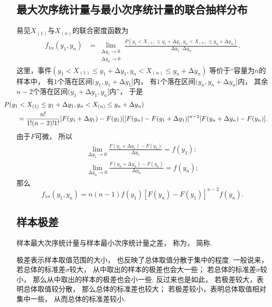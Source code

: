 \subsection{最大次序统计量与最小次序统计量的联合抽样分布}
易见\(X_{(1)}\)与\(X_{(n)}\)的联合密度函数为
\begin{align*}
	f_{1n}(y_1,y_n)
	&= \lim_{\substack{
		\increment y_1\to0 \\
		\increment y_n\to0
	}} \frac{
		P(y_1 < X_{(1)} \leq y_1+\increment y_1,
		  y_n < X_{(n)} \leq y_n+\increment y_n)
	}{\increment y_1 \cdot \increment y_n}.
\end{align*}
这里，事件\((y_1 < X_{(1)} \leq y_1+\increment y_1,
y_n < X_{(n)} \leq y_n+\increment y_n)\)
等价于“容量为\(n\)的样本中，
有\(1\)个落在区间\((y_1,y_1+\increment y_1]\)内，
有\(1\)个落在区间\((y_n,y_n+\increment y_n]\)内，
其余\(n-2\)个落在区间\((y_1+\increment y_1,y_n]\)内”，
于是\begin{align*}
	&\hspace{-20pt}
	P(y_1 < X_{(1)} \leq y_1+\increment y_1,
	  y_n < X_{(n)} \leq y_n+\increment y_n) \\
	&= \frac{n!}{1! (n-2)! 1!}
		[F(y_1+\increment y_1) - F(y_1)]
		[F(y_n) - F(y_1+\increment y_1)]^{n-2}
		[F(y_n+\increment y_n) - F(y_n)].
\end{align*}
由于\(F\)可微，
所以\begin{align*}
	\lim_{\increment y_1\to0}
	\frac{F(y_1+\increment y_1) - F(y_1)}{\increment y_1}
	= f(y_1); \\
	\lim_{\increment y_n\to0}
	\frac{F(y_n+\increment y_n) - F(y_n)}{\increment y_n}
	= f(y_n);
\end{align*}
那么
\begin{equation}\label{equation:次序统计量.最大次序统计量与最小次序统计量的联合密度函数}
	f_{1n}(y_1,y_n)
	= n(n-1) f(y_1) [F(y_n) - F(y_1)]^{n-2} f(y_n).
\end{equation}

\subsection{样本极差}
\begin{definition}
样本最大次序统计量与样本最小次序统计量之差，
称为，
简称.
\end{definition}
极差表示样本取值范围的大小，
也反映了总体取值分散于集中的程度.
一般说来，若总体的标准差\(\sigma\)较大，
从中取出的样本的极差也会大一些；
若总体的标准差\(\sigma\)较小，
那么从中取出的样本的极差也会小一些.
反过来也是如此，
若极差较大，表明总体取值较分散，
那么总体的标准差也较大；
若极差较小，表明总体取值相对集中一些，
从而总体的标准差较小.

